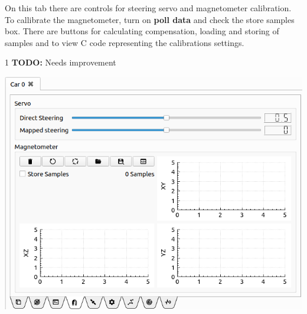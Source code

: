 \documentclass[12pt]{article} %
\def\printtodos{0}
\newcommand{\todo}[1]{
  \if\printtodos1
      {\color{red} \textbf{TODO:} #1}
  \fi}
\begin{document}
\noindent\begin{minipage}{0.5\textwidth} %
On this tab there are controls for steering servo and magnetometer
calibration.  To callibrate the magnetometer, turn on {\bf poll data}
and check the store samples box. There are buttons for calculating
compensation, loading and storing of samples and to view C code
representing the calibrations settings.

\todo{Needs improvement}

\end{minipage}
\begin{minipage}{0.5\textwidth}
  \noindent \includegraphics[width=\textwidth]{./screens/Car_calibration.png}
\end{minipage}
\end{document}
